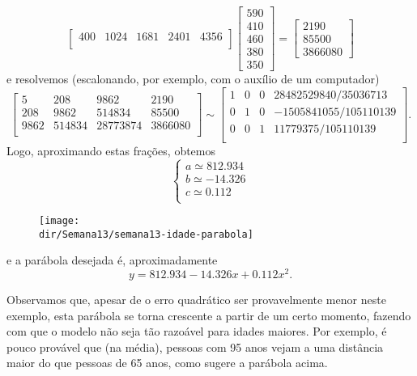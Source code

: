 \documentclass[../livro.tex]{subfiles}  %
\providecommand{\dir}{..}
\begin{document}
\begin{example}
\[\begin{bmatrix}
    400 & 1024 & 1681 & 2401 & 4356 \\
  \end{bmatrix}
  \begin{bmatrix}
    590 \\ 410 \\ 460 \\ 380 \\ 350
  \end{bmatrix} =
  \begin{bmatrix}
    2190 \\ 85500 \\ 3866080
  \end{bmatrix}
  \] e resolvemos (escalonando, por exemplo, com o auxílio de um computador)
  \[
  \begin{bmatrix}
    5 & 208 & 9862 & 2190 \\
    208 & 9862 & 514834 & 85500 \\
    9862 & 514834 & 28773874 & 3866080 \\
  \end{bmatrix} \sim
  \begin{bmatrix}
    1 & 0 & 0 & 28482529840/35036713 \\
    0 & 1 & 0 & -1505841055/105110139 \\
    0 & 0 & 1 & 11779375/105110139 \\
  \end{bmatrix}.
  \] 
  Logo, aproximando estas frações, obtemos
  \[
  \left\{
    \begin{array}{ll}
      a \simeq 812.934 \\
      b \simeq -14.326 \\
      c \simeq  0.112 \\
    \end{array}
  \right.
  \] 
  \begin{figure}[h!]
  	\begin{center}
  		\texttt{[image: \\dir/Semana13/semana13-idade-parabola]}
  	\end{center}
  \end{figure}
  e a parábola desejada é, aproximadamente
  \[
  y = 812.934 - 14.326 x + 0.112 x^2.
  \]
  

  \noindent Observamos que, apesar de o erro quadrático ser provavelmente menor neste exemplo, esta parábola se torna crescente a partir de um certo momento, fazendo com que o modelo não seja tão razoável para idades maiores. Por exemplo, é pouco provável que (na média), pessoas com 95 anos vejam a uma distância maior do que pessoas de 65 anos, como sugere a parábola acima.
\end{example}
\end{document}
